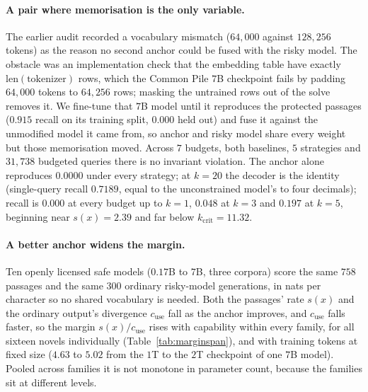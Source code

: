 \paragraph{A pair where memorisation is the only variable.}\label{app:second-anchor}
The earlier audit recorded a vocabulary mismatch ($64{,}000$ against $128{,}256$ tokens) as the reason no
second anchor could be fused with the risky model. The obstacle was an implementation check that the
embedding table have exactly $\mathrm{len}(\text{tokenizer})$ rows, which the Common Pile $7$B checkpoint
fails by padding $64{,}000$ tokens to $64{,}256$ rows; masking the untrained rows out of the solve removes
it. We fine-tune that $7$B model until it reproduces the protected passages ($0.915$ recall on its
training split, $0.000$ held out) and fuse it against the unmodified model it came from, so anchor and
risky model share every weight but those memorisation moved. Across $7$ budgets, both baselines, $5$
strategies and $31{,}738$ budgeted queries there is no invariant violation. The anchor alone reproduces
$0.0000$ under every strategy; at $k=20$ the decoder is the identity (single-query recall $0.7189$, equal
to the unconstrained model's to four decimals); recall is $0.000$ at every budget up to $k=1$, $0.048$ at
$k=3$ and $0.197$ at $k=5$, beginning near $s(x) = 2.39$ and far below $k_{\mathrm{crit}} = 11.32$.

\paragraph{A better anchor widens the margin.}\label{app:scaling}
Ten openly licensed safe models ($0.17$B to $7$B, three corpora) score the same $758$ passages and the same
$300$ ordinary risky-model generations, in nats per character so no shared vocabulary is needed. Both the
passages' rate $s(x)$ and the ordinary output's divergence $c_{\mathrm{use}}$ fall as the anchor improves,
and $c_{\mathrm{use}}$ falls faster, so the margin $s(x)/c_{\mathrm{use}}$ rises with capability within
every family, for all sixteen novels individually (Table~\ref{tab:marginspan}), and with training tokens at
fixed size ($4.63$ to $5.02$ from the $1$T to the $2$T checkpoint of one $7$B model). Pooled across
families it is not monotone in parameter count, because the families sit at different levels.

